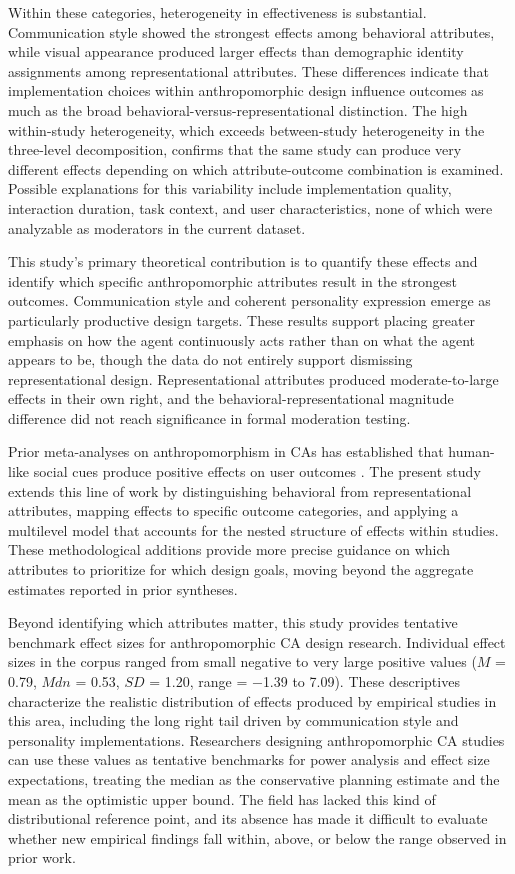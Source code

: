 \documentclass[preprint,review,12pt,authoryear,nonatbib]{elsarticle}
\begin{document}
Within these categories, heterogeneity in effectiveness is substantial. Communication style showed the strongest effects among behavioral attributes, while visual appearance produced larger effects than demographic identity assignments among representational attributes. These differences indicate that implementation choices within anthropomorphic design influence outcomes as much as the broad behavioral-versus-representational distinction. The high within-study heterogeneity, which exceeds between-study heterogeneity in the three-level decomposition, confirms that the same study can produce very different effects depending on which attribute-outcome combination is examined. Possible explanations for this variability include implementation quality, interaction duration, task context, and user characteristics, none of which were analyzable as moderators in the current dataset.

This study's primary theoretical contribution is to quantify these effects and identify which specific anthropomorphic attributes result in the strongest outcomes. Communication style and coherent personality expression emerge as particularly productive design targets. These results support placing greater emphasis on how the agent continuously acts rather than on what the agent appears to be, though the data do not entirely support dismissing representational design. Representational attributes produced moderate-to-large effects in their own right, and the behavioral-representational magnitude difference did not reach significance in formal moderation testing.

Prior meta-analyses on anthropomorphism in CAs has established that human-like social cues produce positive effects on user outcomes \parencite{klein_effects_2025,chaves2021should}. The present study extends this line of work by distinguishing behavioral from representational attributes, mapping effects to specific outcome categories, and applying a multilevel model that accounts for the nested structure of effects within studies. These methodological additions provide more precise guidance on which attributes to prioritize for which design goals, moving beyond the aggregate estimates reported in prior syntheses.

Beyond identifying which attributes matter, this study provides tentative benchmark effect sizes for anthropomorphic CA design research. Individual effect sizes in the corpus ranged from small negative to very large positive values ($M$ = 0.79, $Mdn$ = 0.53, $SD$ = 1.20, range = $-$1.39 to 7.09). These descriptives characterize the realistic distribution of effects produced by empirical studies in this area, including the long right tail driven by communication style and personality implementations. Researchers designing anthropomorphic CA studies can use these values as tentative benchmarks for power analysis and effect size expectations, treating the median as the conservative planning estimate and the mean as the optimistic upper bound. The field has lacked this kind of distributional reference point, and its absence has made it difficult to evaluate whether new empirical findings fall within, above, or below the range observed in prior work.
\end{document}
